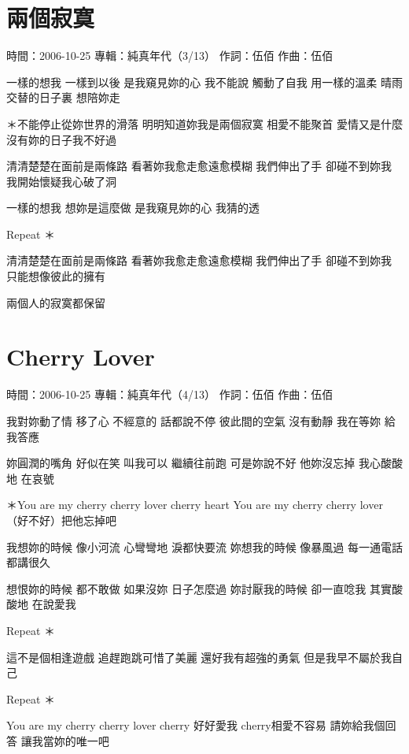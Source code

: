 \documentclass[UTF8,a4paper,oneside,twocolumn,12pt]{ctexbook}
\newcommand{\infopair}[2]{\textbullet #1：#2}
\newcommand{\zc}[1][伍佰]{\infopair{作詞}{#1}}
\newcommand{\zq}[1][伍佰]{\infopair{作曲}{#1}}
\newcommand{\zj}[1]{\infopair{專輯}{#1}}
\newcommand{\sj}[1]{\infopair{時間}{#1}}
\newenvironment{info}{\begin{flushleft}\kaishu
	}
	{\end{flushleft}\normalsize\yahei\par}
\newenvironment{lyric}{
	}
{}
\begin{document}
\section{兩個寂寞}
\begin{info}
	\sj{2006-10-25}
	\zj{純真年代（3/13）}
	\zc
	\zq
\end{info}
\begin{lyric}
	一樣的想我 一樣到以後 是我窺見妳的心 我不能說
	觸動了自我 用一樣的溫柔 晴雨交替的日子裏 想陪妳走

	＊不能停止從妳世界的滑落 明明知道妳我是兩個寂寞
	相愛不能聚首 愛情又是什麼 沒有妳的日子我不好過

	清清楚楚在面前是兩條路 看著妳我愈走愈遠愈模糊
	我們伸出了手 卻碰不到妳我 我開始懷疑我心破了洞

	一樣的想我 想妳是這麼做 是我窺見妳的心 我猜的透

	Repeat ＊

	清清楚楚在面前是兩條路 看著妳我愈走愈遠愈模糊
	我們伸出了手 卻碰不到妳我 只能想像彼此的擁有

	兩個人的寂寞都保留
\end{lyric}

\section{Cherry Lover}
\begin{info}
	\sj{2006-10-25}
	\zj{純真年代（4/13）}
	\zc
	\zq
\end{info}
\begin{lyric}
	我對妳動了情 移了心 不經意的 話都說不停
	彼此間的空氣 沒有動靜 我在等妳 給我答應

	妳圓潤的嘴角 好似在笑 叫我可以 繼續往前跑
	可是妳說不好 他妳沒忘掉 我心酸酸地 在哀號

	＊You are my cherry cherry lover cherry heart
	You are my cherry cherry lover （好不好）把他忘掉吧

	我想妳的時候 像小河流 心彎彎地 淚都快要流
	妳想我的時候 像暴風過 每一通電話 都講很久

	想恨妳的時候 都不敢做 如果沒妳 日子怎麼過
	妳討厭我的時候 卻一直唸我 其實酸酸地 在說愛我

	Repeat ＊

	這不是個相逢遊戲 追趕跑跳可惜了美麗
	還好我有超強的勇氣 但是我早不屬於我自己

	Repeat ＊

	You are my cherry cherry lover cherry 好好愛我
	cherry相愛不容易 請妳給我個回答 讓我當妳的唯一吧
\end{lyric}
\end{document}
